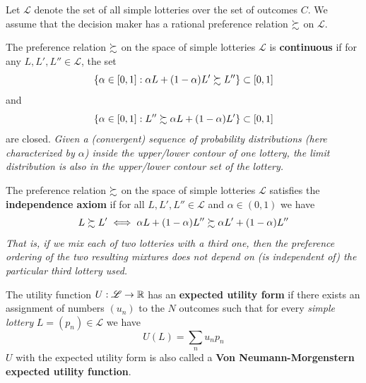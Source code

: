\documentclass{article}
\begin{document}
	 		\begin{assumption}
	 			Let $\mathscr{L}$ denote the set of all simple lotteries over the set of outcomes $C$. We assume that the decision maker has a rational preference relation $\succsim$ on $\mathscr{L}$.
	 		\end{assumption}
	 		
	 		\begin{definition}[6.B.3]
	 			The preference relation $\succsim$ on the space of simple lotteries $\mathscr{L}$ is \textbf{continuous} if for any $L, L', L'' \in \mathscr{L}$, the set
	 			\begin{equation}
	 				\left\{\alpha \in[0,1] : \alpha L + (1-\alpha) L' \succsim L''\right\} \subset[0,1]
	 			\end{equation}
	 			and 
	 			\begin{equation}
	 				\left\{\alpha \in[0,1] : L'' \succsim \alpha L + (1-\alpha) L'\right\} \subset[0,1]
	 			\end{equation}
	 			are closed. \emph{Given a (convergent) sequence of probability distributions (here characterized by $\alpha$) inside the upper/lower contour of one lottery, the limit distribution is also in the upper/lower contour set of the lottery.}
	 		\end{definition}
	 		
	 		\begin{definition}[6.B.4]
	 			The preference relation $\succsim$ on the space of simple lotteries $\mathscr{L}$ satisfies the \textbf{independence axiom} if for all $L, L', L'' \in \mathscr{L}$ and $\alpha \in (0, 1)$ we have
	 			\begin{equation}
	 				L \succsim L' \iff \alpha L + (1 - \alpha) L'' \succsim \alpha L' + (1 - \alpha) L'' 
	 			\end{equation}
	 			\emph{That is, if we mix each of two lotteries with a third one, then the preference ordering of the two resulting mixtures does not depend on (is independent of) the particular third lottery used.}
	 		\end{definition}
	 		
	 		\begin{definition}[6.B.5]
	 			The utility function $U: \mathscr{L} \to \mathbb{R}$ has an \textbf{expected utility form} if there exists an assignment of numbers $(u_n)$ to the $N$ outcomes such that for every \emph{simple lottery} $L = (p_n) \in \mathscr{L}$ we have
	 			\begin{equation}
	 				U(L) = \sum_n u_n p_n
	 			\end{equation}
	 			$U$ with the expected utility form is also called a \textbf{Von Neumann-Morgenstern expected utility function}.
	 		\end{definition}
	 		
\end{document}
